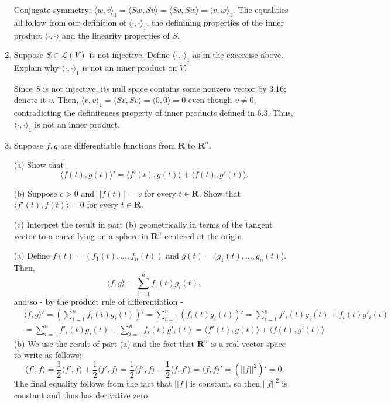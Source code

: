 \documentclass{book}
\begin{document}
\begin{enumerate}
Conjugate symmetry: \(\langle w,v \rangle_1 = \langle Sw,Sv \rangle = \overline{\langle Sv,Sw \rangle} = \overline{\langle v,w \rangle_1}\).  The equalities all follow from our definition of \(\langle \cdot,\cdot \rangle_1\), the definining properties of the inner product \(\langle \cdot,\cdot \rangle\) and the linearity properties of \(S\).

\item Suppose \(S \in \mathcal{L}(V)\) is not injective.  Define \(\langle \cdot,\cdot \rangle_1\) as in the excercise above.  Explain why \(\langle \cdot,\cdot \rangle_1\) is not an inner product on \(V\).

Since \(S\) is not injective, its null space contains some nonzero vector by 3.16; denote it \(v\).  Then, \(\langle v,v \rangle_1 = \langle Sv,Sv \rangle = \langle 0,0 \rangle = 0\) even though \(v \neq 0\), contradicting the definiteness property of inner products defined in 6.3.  Thus, \(\langle \cdot,\cdot \rangle_1\) is not an inner product.

\item Suppose \(f,g\) are differentiable functions from \(\textbf{R}\) to \(\textbf{R}^n\).

(a) Show that \[\langle f(t),g(t) \rangle'=\langle f'(t),g(t) \rangle + \langle f(t),g'(t)\rangle.\]

(b) Suppose \(c>0\) and \(||f(t)||=c\) for every \(t \in \textbf{R}\).  Show that \(\langle f'(t),f(t) \rangle=0\) for every \(t \in \textbf{R}\).

(c) Interpret the result in part (b) geometrically in terms of the tangent vector to a curve lying on a sphere in \(\textbf{R}^n\) centered at the origin.

(a) Define \(f(t)=(f_1(t),\dots,f_n(t))\) and \(g(t)=(g_1(t),\dots,g_n(t)\)).  Then, \[\langle f,g \rangle = \sum_{i=1}^n f_i(t)g_i(t),\] and so - by the product rule of differentiation -
\begin{equation*}
\begin{split}
&\langle f,g \rangle'=\left(\sum_{i=1}^n f_i(t)g_i(t)\right)'=\sum_{i=1}^n (f_i(t)g_i(t))' = \sum_{i=1}^n f'_i(t)g_i(t)+f_i(t)g'_i(t) \\
&= \sum_{i=1}^n f'_i(t)g_i(t)+\sum_{i=1}^n f_i(t)g'_i(t)=\langle f'(t),g(t) \rangle + \langle f(t),g'(t) \rangle
\end{split}
\end{equation*}
(b) We use the result of part (a) and the fact that \(\textbf{R}^n\) is a real vector space to write as follows: \[\langle f',f \rangle = \frac{1}{2} \langle f',f \rangle + \frac{1}{2} \langle f',f \rangle = \frac{1}{2} \langle f',f \rangle + \frac{1}{2} \langle f,f' \rangle = \langle f,f \rangle ' = (||f||^2)' = 0.\] The final equality follows from the fact that \(||f||\) is constant, so then \(||f||^2\) is constant and thus has derivative zero.


\end{enumerate}
\end{document}
